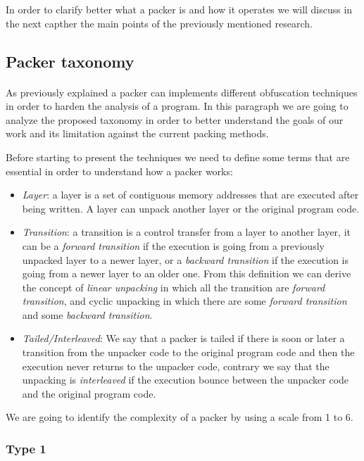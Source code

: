 In order to clarify better what a packer is and how it operates we will discuss in the next capther the main points of the previously mentioned research.

\subsection{Packer taxonomy}
\paragraph{}
As previously explained a packer can implements different obfuscation techniques in order to harden the analysis of a program. In this paragraph we are going to analyze the proposed taxonomy in order to better understand the goals of our work and its limitation against the current packing methods.

Before starting to present the techniques we need to define some terms that are essential in order to understand how a packer works: 
\begin{itemize}
\item \textit{Layer}: a layer is a set of contiguous memory addresses that are executed after being written. A layer can unpack another layer or the original program code.
\item \textit{Transition}: a transition is a control transfer from a layer to another layer, it can be a \textit{forward transition} if the execution is going from a previously unpacked layer to a newer layer, or a \textit{backward transition} if the execution is going from a newer layer to an older one. From this definition we can derive the concept of \textit{linear unpacking} in which all the transition are \textit{forward transition}, and {cyclic unpacking} in which there are some \textit{forward transition} and some \textit{backward transition}. 
\item \textit{Tailed/Interleaved}: We say that a packer is tailed if there is soon or later a transition from the unpacker code to the original program code and then the execution never returns to the unpacker code, contrary we say that the unpacking is \textit{interleaved} if the execution bounce between the unpacker code and the original program code. 
\end{itemize}

We are going to identify the complexity of a packer by using a scale from 1 to 6.

\subsubsection{Type 1}

